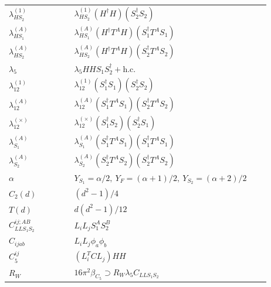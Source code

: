 \documentclass[9pt]{article}
\begin{document}
\begin{longtable}{@{}p{0.23\linewidth}p{0.69\linewidth}@{}}
$\lambda_{HS_2}^{(1)}$ & $\lambda_{HS_2}^{(1)}(H^\dagger H)(S_2^\dagger S_2)$ \\
$\lambda_{HS_1}^{(A)}$ & $\lambda_{HS_1}^{(A)}(H^\dagger T^AH)(S_1^\dagger T^AS_1)$ \\
$\lambda_{HS_2}^{(A)}$ & $\lambda_{HS_2}^{(A)}(H^\dagger T^AH)(S_2^\dagger T^AS_2)$ \\
$\lambda_5$ & $\lambda_5HHS_1S_2^\dagger+\mathrm{h.c.}$ \\
$\lambda_{12}^{(1)}$ & $\lambda_{12}^{(1)}(S_1^\dagger S_1)(S_2^\dagger S_2)$ \\
$\lambda_{12}^{(A)}$ & $\lambda_{12}^{(A)}(S_1^\dagger T^AS_1)(S_2^\dagger T^AS_2)$ \\
$\lambda_{12}^{(\times)}$ & $\lambda_{12}^{(\times)}(S_1^\dagger S_2)(S_2^\dagger S_1)$ \\
$\lambda_{S_1}^{(A)}$ & $\lambda_{S_1}^{(A)}(S_1^\dagger T^A S_1)(S_1^\dagger T^A S_1)$ \\
$\lambda_{S_2}^{(A)}$ & $\lambda_{S_2}^{(A)}(S_2^\dagger T^A S_2)(S_2^\dagger T^A S_2)$ \\
$\alpha$ & $Y_{S_1}=\alpha/2,\ Y_F=(\alpha+1)/2,\ Y_{S_2}=(\alpha+2)/2$ \\
$C_2(d)$ & $(d^2-1)/4$ \\
$T(d)$ & $d(d^2-1)/12$ \\
$C_{LLS_1S_2}^{ij;AB}$ & $L_iL_jS_1^AS_2^B$ \\
$C_{ijab}$ & $L_iL_j\phi_a\phi_b$ \\
$C_5^{ij}$ & $(L_i^TCL_j)HH$ \\
$R_W$ & $16\pi^2\beta_{C_5}\supset R_W\lambda_5C_{LLS_1S_2}$ \\
\bottomrule
\end{longtable}
\end{document}
